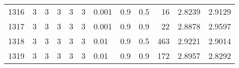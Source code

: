 \begin{longtable}{lrrrrrlrrrrr}
 1316 &       3 & 3 & 3 & 3 & 3 &                       0.001 &      0.9 &    0.5 &      16 &                 2.8239 &                 2.9129 \\
 1317 &       3 & 3 & 3 & 3 & 3 &                       0.001 &      0.9 &    0.9 &      22 &                 2.8878 &                 2.9597 \\
 1318 &       3 & 3 & 3 & 3 & 3 &                        0.01 &      0.9 &    0.5 &     463 &                 2.9221 &                 2.9014 \\
 1319 &       3 & 3 & 3 & 3 & 3 &                        0.01 &      0.9 &    0.9 &     172 &                 2.8957 &                 2.8292 \\
\end{longtable}
